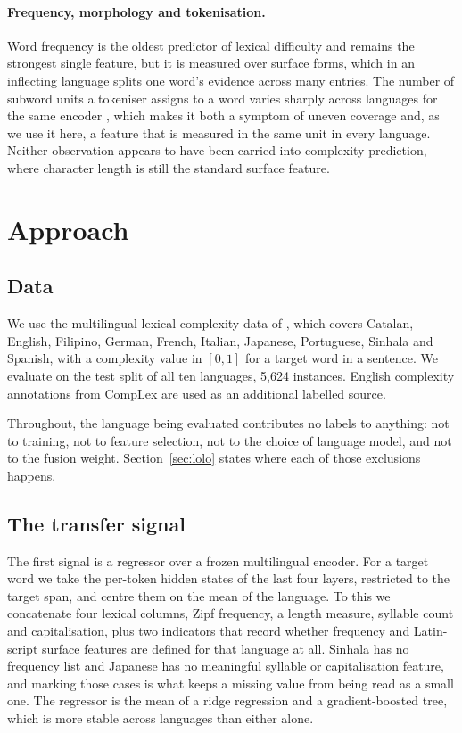 \paragraph{Frequency, morphology and tokenisation.} Word frequency is
the oldest predictor of lexical difficulty and remains the strongest
single feature, but it is measured over surface forms, which in an
inflecting language splits one word's evidence across many entries. The
number of subword units a tokeniser assigns to a word varies sharply
across languages for the same encoder \citep{rust-etal-2021-good}, which
makes it both a symptom of uneven coverage and, as we use it here, a
feature that is measured in the same unit in every language. Neither
observation appears to have been carried into complexity prediction,
where character length is still the standard surface feature.

\section{Approach}
\label{sec:approach}

\subsection{Data}
\label{sec:data}

We use the multilingual lexical complexity data of
\citet{shardlow-etal-2024-bea}, which covers Catalan, English, Filipino,
German, French, Italian, Japanese, Portuguese, Sinhala and Spanish, with
a complexity value in $[0,1]$ for a target word in a sentence. We
evaluate on the test split of all ten languages, 5{,}624 instances.
English complexity annotations from CompLex
\citep{shardlow-etal-2021-semeval} are used as an additional labelled
source.

Throughout, the language being evaluated contributes no labels to
anything: not to training, not to feature selection, not to the choice
of language model, and not to the fusion weight. Section~\ref{sec:lolo}
states where each of those exclusions happens.

\subsection{The transfer signal}
\label{sec:signalA}

The first signal is a regressor over a frozen multilingual encoder. For
a target word we take the per-token hidden states of the last four
layers, restricted to the target span, and centre them on the mean of
the language. To this we concatenate four lexical columns, Zipf
frequency, a length measure, syllable count and capitalisation, plus two
indicators that record whether frequency and Latin-script surface
features are defined for that language at all. Sinhala has no frequency
list and Japanese has no meaningful syllable or capitalisation feature,
and marking those cases is what keeps a missing value from being read as
a small one. The regressor is the mean of a ridge regression and a
gradient-boosted tree, which is more stable across languages than either
alone.

